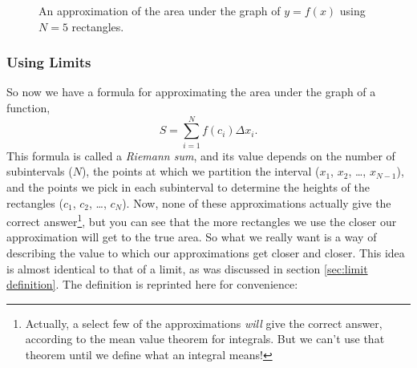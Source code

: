 \documentclass{myarticle}
\theoremstyle{nospace}
\newtheorem{old series theorem}{Theorem}
\newenvironment{series theorem}
{\begin{mdframed}\begin{old series theorem}}
    {\end{old series theorem}\end{mdframed}}
\begin{document}
\begin{figure}[htb!] \centering
  \caption{An approximation of the area under the graph of $y = f(x)$
    using $N = 5$ rectangles.}
  \label{fig:area n}
\end{figure}

\subsubsection{Using Limits}
\label{sec:integral definition using limits}

So now we have a formula for approximating the area under the graph of
a function,
\[
  S = \sum_{i=1}^N f(c_i)\Delta x_i.
\]
This formula is called a \emph{Riemann sum}, and its value depends on
the number of subintervals ($N$), the points at which we partition the
interval ($x_1$, $x_2$, \ldots, $x_{N-1}$), and the points we pick in
each subinterval to determine the heights of the rectangles ($c_1$,
$c_2$, \ldots, $c_N$). Now, none of these approximations actually give
the correct answer\footnote{Actually, a select few of the
  approximations \emph{will} give the correct answer, according to the
  mean value theorem for integrals. But we can't use that theorem
  until we define what an integral means!}, but you can see that the
more rectangles we use the closer our approximation will get to the
true area. So what we really want is a way of describing the value to
which our approximations get closer and closer. This idea is almost
identical to that of a limit, as was discussed in section
\ref{sec:limit definition}. The definition is reprinted here for
convenience:
\end{document}
